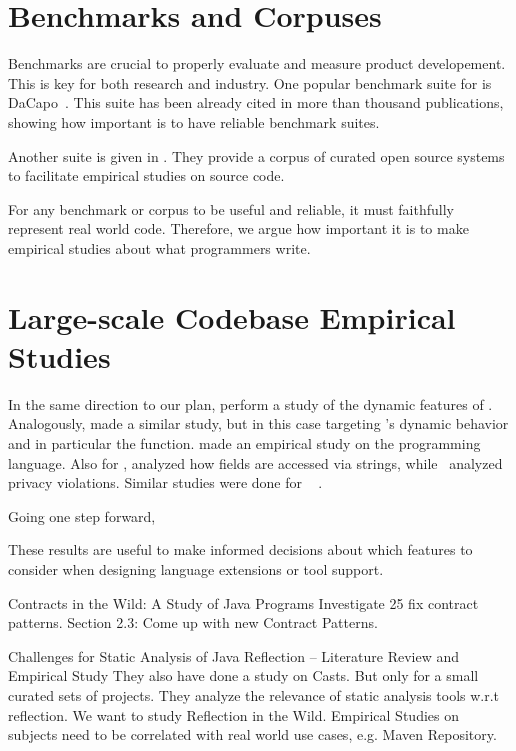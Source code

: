 \section{Benchmarks and Corpuses} \label{sec:benchmarks}

Benchmarks are crucial to properly evaluate and measure product developement.
This is key for both research and industry.
One popular benchmark suite for \java{} is DaCapo~\cite{blackburn_dacapo_2006}.
This suite has been already cited in more than thousand publications, showing how important is to have reliable benchmark suites.

Another suite is given in \cite{tempero_qualitas_2010}.
They provide a corpus of curated open source systems to facilitate empirical studies on source code.

For any benchmark or corpus to be useful and reliable, it must faithfully represent real world code.
Therefore, we argue how important it is to make empirical studies about what programmers write.


\section{Large-scale Codebase Empirical Studies}

In the same direction to our plan, \cite{callau_how_2013} perform a study of the dynamic features of \smalltalk{}.
Analogously, \cite{richards_analysis_2010,richards_eval_2011} made a similar study, but in this case targeting \javascript{}'s dynamic behavior and in particular the \eval{} function.
\cite{reboucas_empirical_2016} made an empirical study on the \swift{} programming language.
Also for \javascript{}, \cite{madsen_string_2014} analyzed how fields are accessed via strings, while~\cite{jang_empirical_2010} analyzed privacy violations.
Similar studies were done for \php{}~
\cite{hills_empirical_2013,dahse_experience_2015,doyle_empirical_2011}.

Going one step forward, \cite{ray_large-scale_2017}

These results are useful to make informed decisions about which features to consider when designing language extensions or tool support.



Contracts in the Wild: A Study of Java Programs
Investigate 25 fix contract patterns.
Section 2.3: Come up with new Contract Patterns.
\cite{dietrich_contracts_2017,dietrich_contracts_2017-1}

\cite{landman_challenges_2017}
Challenges for Static Analysis of Java Reflection -- Literature Review and Empirical Study
They also have done a study on Casts.
But only for a small curated sets of projects.
They analyze the relevance of static analysis tools w.r.t reflection.
We want to study Reflection in the Wild.
Empirical Studies on subjects need to be correlated with real world use cases, e.g. Maven Repository.



